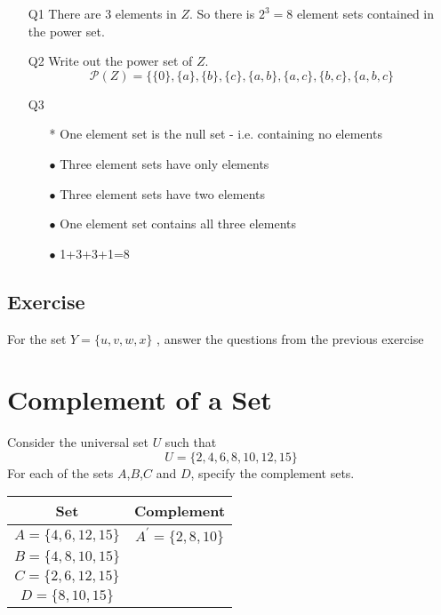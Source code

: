 \documentclass[]{report}
\begin{document}
\begin{itemize}
	
	
	\item[Q1] There are 3 elements in $Z$. So there is $2^3 = 8$ element sets contained in the power set.
	
	\item[Q2] Write out the power set of $Z$.
	\[ \mathcal{P}(Z) = \{ \{0\}, \{a\}, \{b\}, \{c\}, \{a,b\}, \{a,c\}, \{b,c\}, \{a,b,c\} \]
	
	\item[Q3]
	\begin{itemize}
		\item[*] One element set is the null set - i.e. containing no
		elements \item[$\bullet$] Three element sets have only elements \item[$\bullet$]
		Three element sets have two elements \item[$\bullet$] One element set
		contains all three elements \item[$\bullet$] 1+3+3+1=8
	\end{itemize}
\end{itemize}
\subsection*{Exercise}
For the set $Y = \{u,v,w,x\}$ , answer the questions from the
previous exercise



\section*{Complement of a Set}
Consider the universal set $U$ such that
\[U=\{2,4,6,8,10,12,15\} \]
For each of the sets $A$,$B$,$C$ and $D$, specify the complement sets.
\begin{center}
	\begin{tabular}{|c|c|}
		\hline
		Set & Complement\\
		\hline $A=\{4,6,12,15\}$ &
		$A^{\prime}=\{2,8,10\}$ \\ \hline $B=\{4,8,10,15\}$ & \\ \hline
		$C=\{2,6,12,15\}$ & \\ \hline $D=\{8,10,15\}$ & \\ \hline
		
	\end{tabular}
\end{center}
\end{document}
